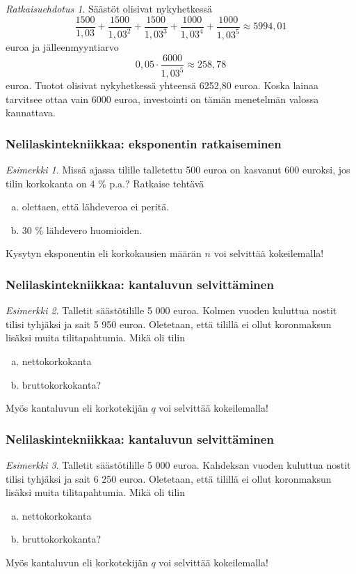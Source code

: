 \documentclass[]{beamer}\usepackage[]{graphicx}\usepackage[]{color}
\theoremstyle{remark}
\newtheorem{esim}{Esimerkki}
\newtheorem{ratkaisu}{Ratkaisuehdotus}
\begin{document}
\begin{frame}
    \begin{ratkaisu}
        Säästöt olisivat nykyhetkessä
        \[
            \frac{1500}{1,03} + \frac{1500}{1,03^2} + \frac{1500}{1,03^3} + \frac{1000}{1,03^4} + \frac{1000}{1,03^5}\approx 5994,01
       \]
       euroa ja jälleenmyyntiarvo
       \[
            0,05\cdot\frac{6000}{1,03^5}\approx 258,78
       \]
       euroa. Tuotot olisivat nykyhetkessä yhteensä 6252,80 euroa. Koska lainaa tarvitsee ottaa vain 6000 euroa,
       investointi on tämän menetelmän valossa kannattava.
    \end{ratkaisu}
\end{frame}

\begin{frame}
    \frametitle{Nelilaskintekniikkaa: eksponentin ratkaiseminen}
    \pause
    \begin{esim}
        Missä ajassa tilille talletettu 500 euroa on kasvanut 600 euroksi, jos tilin korkokanta on 4 \% p.a.?
        Ratkaise tehtävä
        \begin{enumerate}[(a)]
            \item olettaen, että lähdeveroa ei peritä.
            \item 30 \% lähdevero huomioiden.
        \end{enumerate}
    \end{esim}
    \pause
    Kysytyn eksponentin  eli korkokausien määrän $n$ voi selvittää kokeilemalla!
\end{frame}

\begin{frame}
    \frametitle{Nelilaskintekniikkaa: kantaluvun selvittäminen}
    \begin{esim}
        Talletit säästötilille 5 000 euroa. Kolmen vuoden kuluttua nostit tilisi tyhjäksi ja sait 5 950 euroa.
        Oletetaan, että tilillä ei ollut koronmaksun lisäksi muita tilitapahtumia. Mikä oli tilin
        \begin{enumerate}[(a)]
            \item nettokorkokanta
            \item bruttokorkokanta?
        \end{enumerate}
    \end{esim}
    \pause
    Myös kantaluvun eli korkotekijän $q$ voi selvittää kokeilemalla!
\end{frame}

\begin{frame}
    \frametitle{Nelilaskintekniikkaa: kantaluvun selvittäminen}
    \begin{esim}
        Talletit säästötilille 5 000 euroa. Kahdeksan vuoden kuluttua nostit tilisi tyhjäksi ja sait 6 250 euroa.
        Oletetaan, että tilillä ei ollut koronmaksun lisäksi muita tilitapahtumia. Mikä oli tilin
        \begin{enumerate}[(a)]
            \item nettokorkokanta
            \item bruttokorkokanta?
        \end{enumerate}
    \end{esim}
    \pause
    Myös kantaluvun eli korkotekijän $q$ voi selvittää kokeilemalla!
\end{frame}
\end{document}
